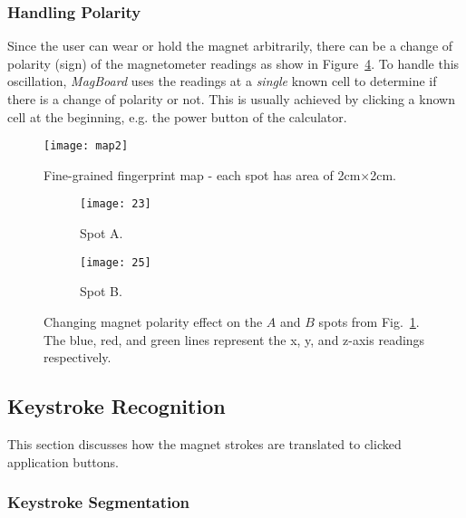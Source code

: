 \documentclass[conference]{IEEEtran}
\def \sys {\textit{MagBoard}}
\begin{document}
\subsubsection{Handling Polarity}

Since the user can wear or hold the magnet arbitrarily, there can be a change of polarity (sign) of the magnetometer readings as show in Figure~\ref{fig:changing_polarity_effect}. To handle this oscillation, \sys{} uses the readings at a \emph{single} known cell to determine if there is a change of polarity or not. This is usually achieved by clicking a known cell at the beginning, e.g. the power button of the calculator. 

\begin{figure}[!t]
\centering
\texttt{[image: map2]}
\caption{Fine-grained fingerprint map - each spot has area of 2cm$\times$2cm. 
}
\label{fig:fingerprint_map}
\vspace{-0.2in}
\end{figure}
\begin{figure}[!t]
\centering
        \begin{subfigure}[t]{0.19\textwidth}
                \centering
                \texttt{[image: 23]}
                \caption{Spot A.}
                \label{fig:spot23}
        \end{subfigure}
        \begin{subfigure}[t]{0.19\textwidth}
                \centering
                \texttt{[image: 25]}
                \caption{Spot B.}
                \label{fig:spot25}
        \end{subfigure}
\caption{Changing magnet polarity effect on the $A$ and $B$ spots from Fig.~\ref{fig:fingerprint_map}. The blue, red, and green lines represent the x, y, and z-axis readings respectively.}
\label{fig:changing_polarity_effect}
\vspace{-0.2in}
\end{figure}

\subsection{Keystroke Recognition}

This section discusses how the magnet strokes are translated to clicked application buttons.

\subsubsection{Keystroke Segmentation} 
\label{sec:motion_det}
\end{document}
